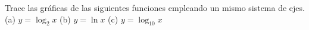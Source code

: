 \item Trace las gráficas de las siguientes funciones empleando un mismo sistema de ejes.\\
(a) $y = \log_2 x$ \qquad (b) $y = \ln x$ \qquad (c) $y = \log_{10} x$
